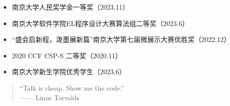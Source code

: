 \documentclass[10pt,a4paper,ragged2e,withhyper]{altacv}
\begin{document}
\begin{paracol}{2}
\newpage

\switchcolumn


\begin{itemize}
\item 南京大学人民奖学金一等奖（2023.11）
\item 南京大学软件学院EL程序设计大赛算法组二等奖（2023.6）
\item “盛会启新程，泼墨展新篇”南京大学第七届微展示大赛优胜奖（2022.12）
\item 2020 CCF CSP-S 二等奖（2020.11）
\end{itemize}

\begin{itemize}
  \item 南京大学新生学院优秀学生（2023.6）
\end{itemize}

\medskip


\begin{quote}
``Talk is cheap. Show me the code.''\\
\quad\quad\quad\quad\quad\quad------ Linus Torvalds
\end{quote}


\divider\smallskip

\\



\divider

\divider


\medskip







\end{paracol}
\end{document}

